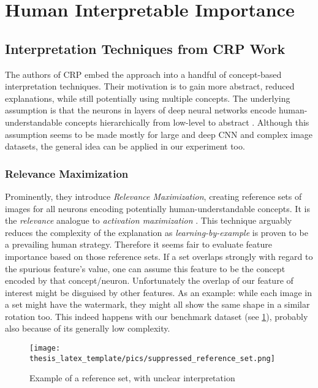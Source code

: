 \section{Human Interpretable Importance}
\subsection{Interpretation Techniques from CRP Work}
The authors of CRP embed the approach into a handful of concept-based interpretation techniques. Their motivation is to gain more abstract, reduced explanations, while still potentially using multiple concepts. The underlying assumption is that the neurons in layers of deep neural networks encode human-understandable concepts hierarchically from low-level to abstract \cite{Zeiler2013,Bau2017,Olah2017}. Although this assumption seems to be made mostly for large and deep CNN and complex image datasets, the general idea can be applied in our experiment too. 

\subsubsection{Relevance Maximization}
Prominently, they introduce \textit{Relevance Maximization}, creating reference sets of images for all neurons encoding potentially human-understandable concepts. It is the \textit{relevance} analogue to \textit{activation maximization} \cite{Nguyen2016}. This technique arguably reduces the complexity of the explanation as \textit{learning-by-example} is proven to be a prevailing human strategy.
Therefore it seems fair to evaluate feature importance based on those reference sets. If a set overlaps strongly with regard to the spurious feature's value, one can assume this feature to be the concept encoded by that concept/neuron. 
Unfortunately the overlap of our feature of interest might be disguised by other features. As an example: while each image in a set might have the watermark, they might all show the same shape in a similar rotation too. This indeed happens with our benchmark dataset (see \cref{fig:suppressor_ref}), probably also because of its generally low complexity. 

\begin{figure}
    \centering
    \texttt{[image: thesis\_latex\_template/pics/suppressed\_reference\_set.png]}
    \caption[Reference Set Interpretation]{Example of a reference set, with unclear interpretation}
    \label{fig:suppressor_ref}
\end{figure}

